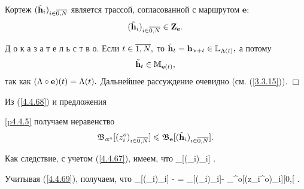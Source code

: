 \begin{pred}
\label{p4.4.5}
Кортеж $(\tilde{\mathbf{h}}_i)_{i\in\ov{0,N}}$
является трассой, согласованной с маршрутом $\mathbf{e}:$
$$
  (\tilde{\mathbf{h}}_i)_{i\in\ov{0,N}}\in \mathbf{Z}_\mathbf{e}
  .
$$
\end{pred}

Д о к а з а т е л ь с т в о.
Если $t\in \ov{1,N},$
то
$\tilde{\mathbf{h}}_t = \mathbf{h}_{\upnu +t}\in {\mathbb L}_{\Lambda(t)},$
а потому
$$
  \tilde{\mathbf{h}}_t \in {\mathbb M}_{\mathbf{e}(t)}
  ,
$$
так как $(\Lambda \circ \mathbf{e})(t) = \Lambda(t).$
Дальнейшее рассуждение очевидно
(см. (\ref{3.3.15})).
\hfill $\Box$

Из (\ref{4.4.68}) и предложения~{\ref{p4.4.5} получаем неравенство
$$
  \mathfrak{B}_{\al^o}[(z_i^o)_{i\in\ov{0,N}}]\leqslant
  \mathfrak{B}_\mathbf{e}[(\tilde{\mathbf{h}}_i)_{i\in\ov{0,N}}]
  .
$$

Как следствие, с учетом (\ref{4.4.67}), имеем, что
\bfn
  \label{4.4.69}
   \leqslant {}_[(_i)_{i\in{}}]
  .
\efn

Учитывая (\ref{4.4.69}), получаем, что
\bfn
  \label{4.4.70}
  \kappa \df {}_[(_i)_{i\in{}}] -
   = _[(_i)_{i\in{}}]-
  _{\al^o}[(z_i^o)_{i\in{}}]\in [0,\infty[
  .
\efn

}
